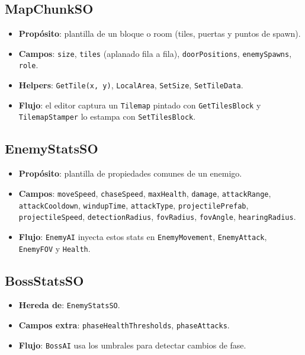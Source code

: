 \documentclass[a4paper,12pt]{article}
\begin{document}
\subsection{MapChunkSO}

\begin{itemize}
    \item \textbf{Propósito}: plantilla de un bloque o room (tiles, puertas y puntos de spawn).
    \item \textbf{Campos}: \texttt{size}, \texttt{tiles} (aplanado fila a fila), \texttt{doorPositions}, \texttt{enemySpawns}, \texttt{role}.
    \item \textbf{Helpers}: \texttt{GetTile(x, y)}, \texttt{LocalArea}, \texttt{SetSize}, \texttt{SetTileData}.
    \item \textbf{Flujo}: el editor captura un \texttt{Tilemap} pintado con \texttt{GetTilesBlock} y \texttt{TilemapStamper} lo estampa con \texttt{SetTilesBlock}.
\end{itemize}

\subsection{EnemyStatsSO}

\begin{itemize}
    \item \textbf{Propósito}: plantilla de propiedades comunes de un enemigo.
    \item \textbf{Campos}: \texttt{moveSpeed}, \texttt{chaseSpeed}, \texttt{maxHealth}, \texttt{damage}, \texttt{attackRange}, \texttt{attackCooldown}, \texttt{windupTime}, \texttt{attackType}, \texttt{projectilePrefab}, \texttt{projectileSpeed}, \texttt{detectionRadius}, \texttt{fovRadius}, \texttt{fovAngle}, \texttt{hearingRadius}.
    \item \textbf{Flujo}: \texttt{EnemyAI} inyecta estos stats en \texttt{EnemyMovement}, \texttt{EnemyAttack}, \texttt{EnemyFOV} y \texttt{Health}.
\end{itemize}

\subsection{BossStatsSO}

\begin{itemize}
    \item \textbf{Hereda de}: \texttt{EnemyStatsSO}.
    \item \textbf{Campos extra}: \texttt{phaseHealthThresholds}, \texttt{phaseAttacks}.
    \item \textbf{Flujo}: \texttt{BossAI} usa los umbrales para detectar cambios de fase.
\end{itemize}
\end{document}
